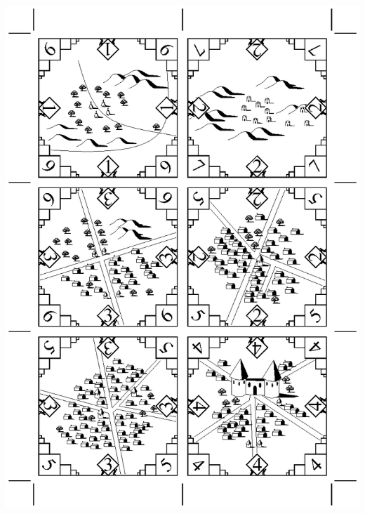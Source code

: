 \documentclass[12pt]{article}
\begin{document}
\begin{center}

~\vfill

\includegraphics[width=7in]{tile_sheet_1.eps}

\vfill

\newpage

~\vfill


\end{center}
\end{document}
